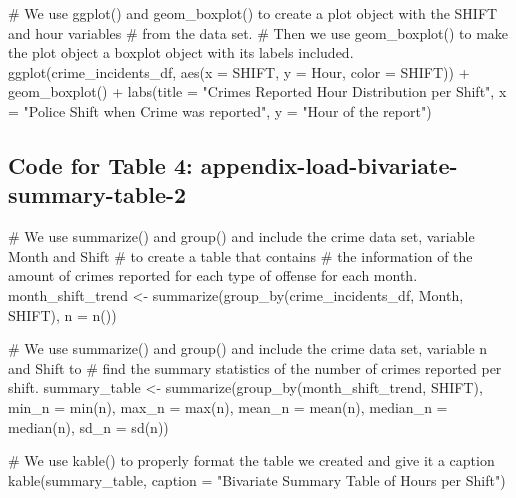 \documentclass[
]{article}
\newenvironment{Shaded}{}{}
\newcommand{\AttributeTok}[1]{#1}
\newcommand{\CommentTok}[1]{\textcolor[rgb]{0.00,0.50,0.00}{#1}}
\newcommand{\FunctionTok}[1]{#1}
\newcommand{\NormalTok}[1]{#1}
\newcommand{\OtherTok}[1]{\textcolor[rgb]{1.00,0.25,0.00}{#1}}
\newcommand{\SpecialCharTok}[1]{\textcolor[rgb]{0.00,0.50,0.50}{#1}}
\newcommand{\StringTok}[1]{\textcolor[rgb]{0.00,0.50,0.50}{#1}}
\begin{document}
\begin{Shaded}
\begin{Highlighting}[]
\CommentTok{\# We use ggplot() and geom\_boxplot() to create a plot object with the SHIFT and hour variables}
\CommentTok{\# from the data set. }
\CommentTok{\# Then we use geom\_boxplot() to make the plot object a boxplot object with its labels included.}
\FunctionTok{ggplot}\NormalTok{(crime\_incidents\_df,}
       \FunctionTok{aes}\NormalTok{(}\AttributeTok{x =}\NormalTok{ SHIFT, }
           \AttributeTok{y =}\NormalTok{ Hour, }
           \AttributeTok{color =}\NormalTok{ SHIFT)) }\SpecialCharTok{+}
  \FunctionTok{geom\_boxplot}\NormalTok{() }\SpecialCharTok{+} 
  \FunctionTok{labs}\NormalTok{(}\AttributeTok{title =} \StringTok{"Crimes Reported Hour Distribution per Shift"}\NormalTok{,}
       \AttributeTok{x =} \StringTok{"Police Shift when Crime was reported"}\NormalTok{,}
       \AttributeTok{y =} \StringTok{"Hour of the report"}\NormalTok{)}
\end{Highlighting}
\end{Shaded}

\subsection{Code for Table 4:
appendix-load-bivariate-summary-table-2}\label{code-for-table-4-appendix-load-bivariate-summary-table-2}

\begin{Shaded}
\begin{Highlighting}[]
\CommentTok{\# We use summarize() and group() and include the crime data set, variable Month and Shift }
\CommentTok{\# to create a table that contains}
\CommentTok{\# the information of the amount of crimes reported for each type of offense for each month.}
\NormalTok{month\_shift\_trend }\OtherTok{\textless{}{-}} \FunctionTok{summarize}\NormalTok{(}\FunctionTok{group\_by}\NormalTok{(crime\_incidents\_df, Month, SHIFT), }\AttributeTok{n =} \FunctionTok{n}\NormalTok{())}

\CommentTok{\# We use summarize() and group() and include the crime data set, variable n and Shift to }
\CommentTok{\# find the summary statistics of the number of crimes reported per shift.}
\NormalTok{summary\_table }\OtherTok{\textless{}{-}} \FunctionTok{summarize}\NormalTok{(}\FunctionTok{group\_by}\NormalTok{(month\_shift\_trend, SHIFT),}
                           \AttributeTok{min\_n =} \FunctionTok{min}\NormalTok{(n),}
                           \AttributeTok{max\_n =} \FunctionTok{max}\NormalTok{(n),}
                           \AttributeTok{mean\_n =} \FunctionTok{mean}\NormalTok{(n),}
                           \AttributeTok{median\_n =} \FunctionTok{median}\NormalTok{(n),}
                           \AttributeTok{sd\_n =} \FunctionTok{sd}\NormalTok{(n))}

\CommentTok{\# We use kable() to properly format the table we created and give it a caption}
\FunctionTok{kable}\NormalTok{(summary\_table, }\AttributeTok{caption =} \StringTok{"Bivariate Summary Table of Hours per Shift"}\NormalTok{)}
\end{Highlighting}
\end{Shaded}
\end{document}
